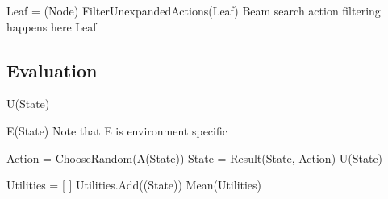 \begin{algorithm}[H]
    \begin{algorithmic}[1]
        \State Leaf = (Node)
        \State FilterUnexpandedActions(Leaf)
        \Comment Beam search action filtering happens here
        \State \Return Leaf
        \EndProcedure
    \end{algorithmic}    
\end{algorithm}

\newpage
\subsection*{Evaluation}

\begin{algorithm}[H]
    \begin{algorithmic}[1]
            \State \Return U(State)
        \EndProcedure
    \end{algorithmic}    
\end{algorithm}

\begin{algorithm}[H]
    \begin{algorithmic}[1]
            \State \Return E(State)
            \Comment Note that E is environment specific
        \EndProcedure
    \end{algorithmic}    
\end{algorithm}

\begin{algorithm}[H]
    \begin{algorithmic}[1]
                \State Action = ChooseRandom(A(State))
                \State State = Result(State, Action)
            \EndWhile
            \State \Return U(State)
        \EndProcedure
    \end{algorithmic}    
\end{algorithm}

\begin{algorithm}[H]
    \begin{algorithmic}[1]
            \State Utilities = [ ]
                \State Utilities.Add((State))
            \EndFor
            \State \Return Mean(Utilities)
        \EndProcedure
    \end{algorithmic}    
\end{algorithm}

